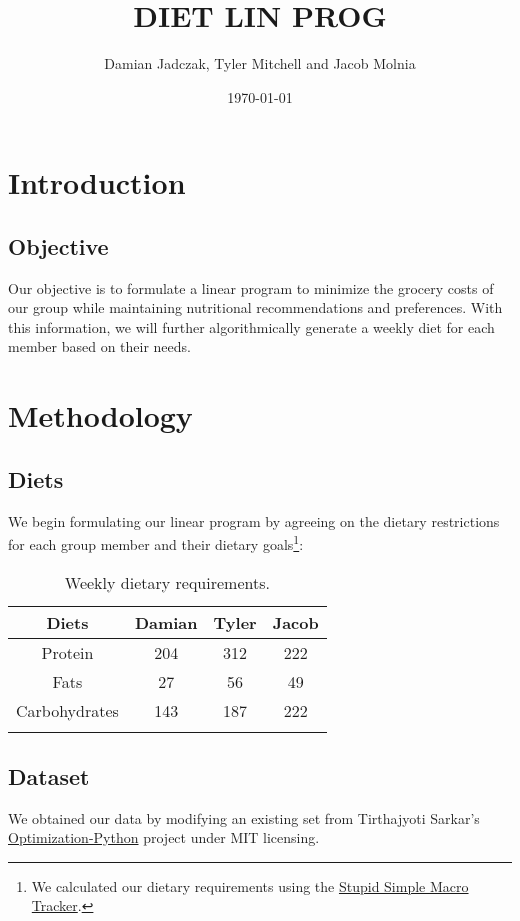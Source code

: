 \documentclass[12pt, english]{report}
\title{DIET LIN PROG}
\author{Damian Jadczak, Tyler Mitchell and Jacob Molnia}
\date\today
\begin{document}
\maketitle
\tableofcontents
\pagebreak
\chapter{Introduction}
\vspace*{-1in}
\section{Objective}
Our objective is to formulate a linear program to minimize the grocery costs of our group while maintaining nutritional recommendations and preferences. With this information, we will further algorithmically generate a weekly diet for each member based on their needs.
\chapter{Methodology}
\vspace*{-1in}
\section{Diets}
We begin formulating our linear program by agreeing on the dietary restrictions for each group member and their dietary goals\footnote{We calculated our dietary requirements using the \href{https://apps.apple.com/us/app/stupid-simple-macro-tracker/id1210995590}{Stupid Simple Macro Tracker}.}:
\begin{table}[H]
    \centering
    \caption[short]{Weekly dietary requirements.}
    \begin{tabular}{cccc}
        \toprule
        Diets & Damian & Tyler & Jacob\\ 
        \midrule
        Protein & 204 &312 & 222 \\ 
        Fats &27 &56 & 49\\ 
        Carbohydrates &143 &187 & 222 \\
    \bottomrule
    \label{tab:diet}
    \end{tabular}
\end{table}
\section{Dataset}
We obtained our data by modifying an existing set from Tirthajyoti Sarkar's \href{https://github.com/tirthajyoti/Optimization-Python/blob/master/Data/diet.xls}{Optimization-Python} project under MIT licensing.
\pagebreak
\printbibliography
\end{document}
